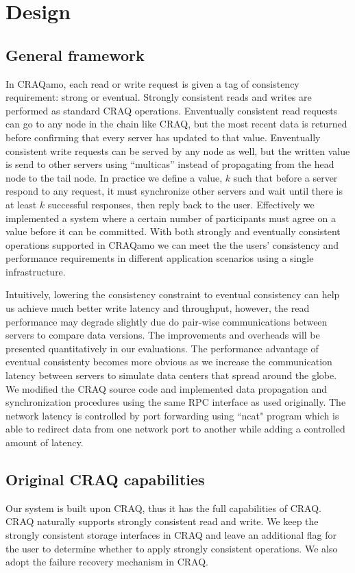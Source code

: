 \section{Design}
\label{sec:design}

\subsection{General framework}
In CRAQamo, each read or write request is given a tag of consistency requirement: strong or eventual. Strongly consistent reads and writes are performed as standard CRAQ operations. Enventually consistent read requests can go to any node in the chain like CRAQ, but the most recent data is returned before confirming that every server has updated to that value. Enventually consistent write requests can be served by any node as well, but the written value is send to other servers using ``multicas'' instead of propagating from the head node to the tail node. In practice we define a value, $k$ such that before a server respond to any request, it must synchronize other servers and wait until there is at least $k$ successful responses, then reply back to the user. Effectively we implemented a system where a certain number of participants must agree on a value before it can be committed. With both strongly and eventually consistent operations supported in CRAQamo we can meet the the users' consistency and performance requirements in different application scenarios using a single infrastructure. 

Intuitively, lowering the consistency constraint to eventual consistency can help us achieve much better write latency and throughput, however, the read performance may degrade slightly due do pair-wise communications between servers to compare data versions. The improvements and overheads will be presented quantitatively in our evaluations. The performance advantage of eventual consistenty becomes more obvious as we increase the communication latency between servers to simulate data centers that spread around the globe. We modified the CRAQ source code and implemented data propagation and synchronization procedures using the same RPC interface as used originally. The network latency is controlled by port forwarding using ``ncat" program which is able to redirect data from one network port to another while adding a controlled amount of latency.

\subsection{Original CRAQ capabilities}
Our system is built upon CRAQ, thus it has the full capabilities of CRAQ. CRAQ naturally supports strongly consistent read and write. We keep the strongly consistent storage interfaces in CRAQ and leave an additional flag for the user to determine whether to apply strongly consistent operations. We also adopt the failure recovery mechanism in CRAQ.

